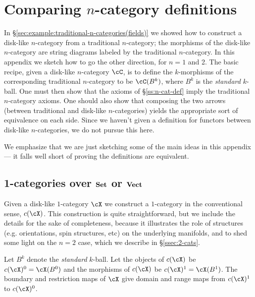
\section{Comparing \texorpdfstring{$n$}{n}-category definitions}
\label{sec:comparing-defs}

In \S\ref{sec:example:traditional-n-categories(fields)} we showed how to construct
a disk-like  $n$-category from a traditional $n$-category; the morphisms of the 
disk-like  $n$-category are string diagrams labeled by the traditional $n$-category.
In this appendix we sketch how to go the other direction, for $n=1$ and 2.
The basic recipe, given a disk-like $n$-category $\cC$, is to define the $k$-morphisms
of the corresponding traditional $n$-category to be $\cC(B^k)$, where
$B^k$ is the {\it standard} $k$-ball.
One must then show that the axioms of \S\ref{ss:n-cat-def} imply the traditional $n$-category axioms.
One should also show that composing the two arrows (between traditional and disk-like $n$-categories)
yields the appropriate sort of equivalence on each side.
Since we haven't given a definition for functors between disk-like $n$-categories, we do not pursue this here.

We emphasize that we are just sketching some of the main ideas in this appendix ---
it falls well short of proving the definitions are equivalent.


\subsection{1-categories over \texorpdfstring{$\text{\textbf{Set}}$ or $\text{\textbf{Vect}}$}{Set or Vect}}
\label{ssec:1-cats}
Given a disk-like $1$-category $\cX$ we construct a $1$-category in the conventional sense, $c(\cX)$.
This construction is quite straightforward, but we include the details for the sake of completeness, 
because it illustrates the role of structures (e.g. orientations, spin structures, etc) 
on the underlying manifolds, and 
to shed some light on the $n=2$ case, which we describe in \S \ref{ssec:2-cats}.

Let $B^k$ denote the \emph{standard} $k$-ball.
Let the objects of $c(\cX)$ be $c(\cX)^0 = \cX(B^0)$ and the morphisms of $c(\cX)$ be $c(\cX)^1 = \cX(B^1)$.
The boundary and restriction maps of $\cX$ give domain and range maps from $c(\cX)^1$ to $c(\cX)^0$.

